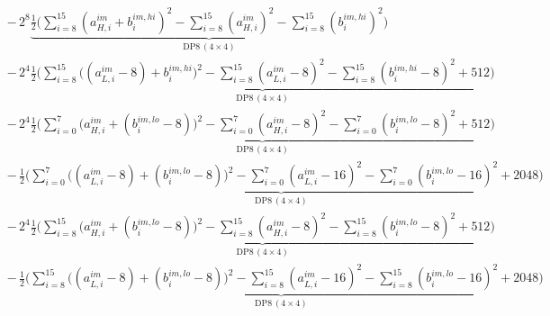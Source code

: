 \documentclass[fleqn]{article}
\newcommand{\DPop}[3]{\mathrm{DP#1}\,(#2\!\times\!#3)}
\begin{document}
\begin{align*}
  & -\, 2^{8}\underbrace{\tfrac12\Big(\sum_{i=8}^{15}(a_{H,i}^{im}{+}b_i^{im,hi})^2 - \sum_{i=8}^{15}(a_{H,i}^{im})^2 - \sum_{i=8}^{15}(b_i^{im,hi})^2\Big)}_{\DPop{8}{4}{4}} \\[0.6em]
  & -\, 2^{4}\underbrace{\tfrac12\Big(\sum_{i=8}^{15}\big((a_{L,i}^{im}{-}8){+}b_i^{im,hi}\big)^2 - \sum_{i=8}^{15}(a_{L,i}^{im}{-}8)^2 - \sum_{i=8}^{15}(b_i^{im,hi}{-}8)^2 + 512\Big)}_{\DPop{8}{4}{4}} \\[0.6em]
  & -\, 2^{4}\underbrace{\tfrac12\Big(\sum_{i=0}^{7}\big(a_{H,i}^{im}{+}(b_i^{im,lo}{-}8)\big)^2 - \sum_{i=0}^{7}(a_{H,i}^{im}{-}8)^2 - \sum_{i=0}^{7}(b_i^{im,lo}{-}8)^2 + 512\Big)}_{\DPop{8}{4}{4}} \\[0.6em]
  & -\, \underbrace{\tfrac12\Big(\sum_{i=0}^{7}\big((a_{L,i}^{im}{-}8){+}(b_i^{im,lo}{-}8)\big)^2 - \sum_{i=0}^{7}(a_{L,i}^{im}{-}16)^2 - \sum_{i=0}^{7}(b_i^{im,lo}{-}16)^2 + 2048\Big)}_{\DPop{8}{4}{4}} \\[0.6em]
  & -\, 2^{4}\underbrace{\tfrac12\Big(\sum_{i=8}^{15}\big(a_{H,i}^{im}{+}(b_i^{im,lo}{-}8)\big)^2 - \sum_{i=8}^{15}(a_{H,i}^{im}{-}8)^2 - \sum_{i=8}^{15}(b_i^{im,lo}{-}8)^2 + 512\Big)}_{\DPop{8}{4}{4}} \\[0.6em]
  & -\, \underbrace{\tfrac12\Big(\sum_{i=8}^{15}\big((a_{L,i}^{im}{-}8){+}(b_i^{im,lo}{-}8)\big)^2 - \sum_{i=8}^{15}(a_{L,i}^{im}{-}16)^2 - \sum_{i=8}^{15}(b_i^{im,lo}{-}16)^2 + 2048\Big)}_{\DPop{8}{4}{4}}
\end{align*}
\end{document}
